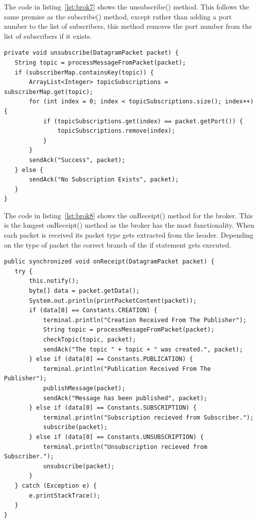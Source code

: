 \documentclass{article}
\begin{document}
The code in listing~\ref{lst:brok7} shows the unsubscribe() method. This follows the same premise as the subscribe() method, except rather than adding a port number to the list of subscribers, this method removes the port number from the list of subscribers if it exists.

\begin{lstlisting}[caption={[Sample Code 2]onReceipt() method, handles packets received on the publishers port}, label={lst:brok7}]
private void unsubscribe(DatagramPacket packet) {
   String topic = processMessageFromPacket(packet);
   if (subscriberMap.containsKey(topic)) {
	   ArrayList<Integer> topicSubscriptions = subscriberMap.get(topic);
	   for (int index = 0; index < topicSubscriptions.size(); index++) {
		   if (topicSubscriptions.get(index) == packet.getPort()) {
			   topicSubscriptions.remove(index);
		   }
	   }
	   sendAck("Success", packet);
   } else {
	   sendAck("No Subscription Exists", packet);
   }
}
\end{lstlisting}

The code in listing~\ref{lst:brok8} shows the onReceipt() method for the broker. This is the longest onReceipt() method as the broker has the most functionality. When each packet is received its packet type gets extracted from the header. Depending on the type of packet the correct branch of the if statement gets executed.

\begin{lstlisting}[caption={[Sample Code 2]onReceipt() method, handles packets received on the publishers port}, label={lst:brok8}]
public synchronized void onReceipt(DatagramPacket packet) {
   try {
	   this.notify();
	   byte[] data = packet.getData();
	   System.out.println(printPacketContent(packet));
	   if (data[0] == Constants.CREATION) {
		   terminal.println("Creation Received From The Publisher");
		   String topic = processMessageFromPacket(packet);
		   checkTopic(topic, packet);
		   sendAck("The topic " + topic + " was created.", packet);
	   } else if (data[0] == Constants.PUBLICATION) {
		   terminal.println("Publication Received From The Publisher");
		   publishMessage(packet);
		   sendAck("Message has been published", packet);
	   } else if (data[0] == Constants.SUBSCRIPTION) {
		   terminal.println("Subscription recieved from Subscriber.");
		   subscribe(packet);
	   } else if (data[0] == Constants.UNSUBSCRIPTION) {
		   terminal.println("Unsubscription recieved from Subscriber.");
		   unsubscribe(packet);
	   }
   } catch (Exception e) {
	   e.printStackTrace();
   }
}
\end{lstlisting}
\pagebreak
\end{document}

